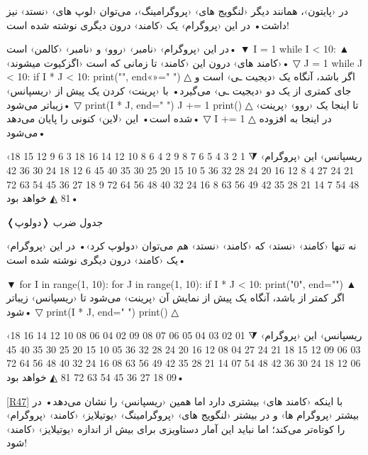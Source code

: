 \documentclass[openany, twocolumn]{book}
\begin{document}
\begin{InlinePrograms}
\begin{Program}
در ‹پایتون›، همانند دیگر ‹لنگویج های› ‹پروگرامینگ›، می‌توان ‹لوپ های› ‹نستد› نیز داشت• در این ‹پروگرام› یک ‹کامند›  درون دیگری نوشته شده است!

در این ‹پروگرام›  ‹نامبر› ‹روو› و  ‹نامبر› ‹کالمن› است• 
▼
I = 1
while I < 10:
▲
 ‹کامند های› درون این ‹کامند›  تا زمانی که  است ‹اگزکیوت میشوند›• 
▽
	J = 1
	while J < 10:
		if I * J < 10:
			print("", end«\NewNoteMark»=" ")
△
 اگر  باشد، آنگاه  یک ‹دیجیت ـی› است و جای کمتری از یک دو ‹دیجیت ـی› می‌گیرد• با ‹پرینت› کردن یک \likestring{ } پیش از  ‹ریسپانس› زیبا‌تر می‌شود• 
▽
		print(I * J, end=" ")
		J += 1
	print()
△
 تا اینجا یک ‹روو› ‹پرینت› شده است• این  ‹لاین› کنونی را پایان می‌دهد• 
▽
	I += 1
△
 در اینجا به  افزوده می‌شود•

‹ریسپانس› این ‹پروگرام› 
⧨
 1  2  3  4  5  6  7  8  9 
 2  4  6  8 10 12 14 16 18 
 3  6  9 12 15 18 21 24 27 
 4  8 12 16 20 24 28 32 36 
 5 10 15 20 25 30 35 40 45 
 6 12 18 24 30 36 42 48 54 
 7 14 21 28 35 42 49 56 63 
 8 16 24 32 40 48 56 64 72 
 9 18 27 36 45 54 63 72 81 
◭
 خواهد بود•
\end{Program}

\begin{Program}
\caption{❬دولوپ❭ جدول ضرب\label{R48}}

نه تنها ‹کامند›  ‹نستد› که ‹کامند›  ‹نستد› هم می‌توان ‹دولوپ کرد›• در این ‹پروگرام› یک ‹کامند›  درون دیگری نوشته شده است•

▼
for I in range(1, 10):
	for J in range(1, 10):
		if I * J < 10:
			print("0", end="")
▲
 اگر  کمتر از  باشد، آنگاه یک  پیش از نمایش آن ‹پرینت› می‌شود تا ‹ریسپانس› زیبا‌تر شود• 
▽
		print(I * J, end=" ")
	print()
△

‹ریسپانس› این ‹پروگرام› 
⧨
01 02 03 04 05 06 07 08 09 
02 04 06 08 10 12 14 16 18 
03 06 09 12 15 18 21 24 27 
04 08 12 16 20 24 28 32 36 
05 10 15 20 25 30 35 40 45 
06 12 18 24 30 36 42 48 54 
07 14 21 28 35 42 49 56 63 
08 16 24 32 40 48 56 64 72 
09 18 27 36 45 54 63 72 81 
◭
 خواهد بود•

\ref{R47} با اینکه ‹کامند های› بیشتری دارد اما همین ‹ریسپانس› را نشان می‌دهد• در بیشتر ‹پروگرام ها› و در بیشتر ‹لنگویج های› ‹پروگرامینگ› ‹یوتیلایز› ‹کامند›  ‹پروگرام› را کوتاه‌تر می‌کند؛ اما نباید این آمار دستاویزی برای بیش از اندازه ‹یوتیلایز› ‹کامند›  شود!
\end{Program}


\end{InlinePrograms}
\end{document}
